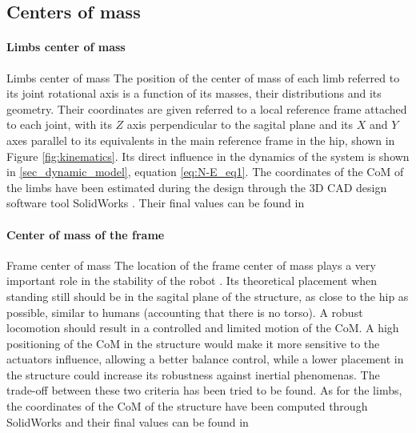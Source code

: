 
\subsection{Centers of mass} %
\label{sub:centers_of_mass}

\paragraph{Limbs center of mass} %
\label{par:limbs_center_of_mass}
Limbs center of mass
The position of the center of mass of each limb referred to its joint rotational axis is a function of its masses, their distributions and its geometry.
Their coordinates are given referred to a local reference frame attached to each joint, with its $Z$ axis perpendicular to the sagital plane and its $X$ and $Y$ axes parallel to its equivalents in the main reference frame in the hip, shown in Figure \ref{fig:kinematics}.
Its direct influence in the dynamics of the system is shown in \ref{sec_dynamic_model}, equation \ref{eq:N-E_eq1}.
The coordinates of the CoM of the limbs have been estimated during the design through the 3D CAD design software tool SolidWorks \cite{solidworks}.
Their final values can be found in %


\paragraph{Center of mass of the frame} %
\label{par:center_of_mass_of_the_frame}
Frame center of mass
The location of the frame center of mass plays a very important role in the stability of the robot \cite{rojas}.
Its theoretical placement when standing still should be in the sagital plane of the structure, as close to the hip as possible, similar to humans (accounting that there is no torso).
A robust locomotion should result in a controlled and limited motion of the CoM. 
A high positioning of the CoM in the structure would make it more sensitive to the actuators influence, allowing a better balance control, while a lower placement in the structure could increase its robustness against inertial phenomenas.
The trade-off between these two criteria has been tried to be found.
As for the limbs, the coordinates of the CoM of the structure have been computed through SolidWorks and their final values can be found in %

